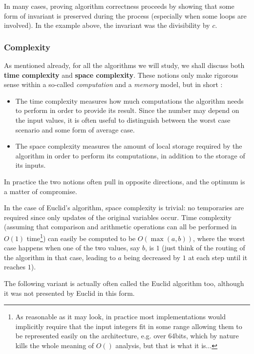 \documentclass[12pt]{article}
\theoremstyle{plain}
\theoremstyle{remark}
\begin{document}
In many cases, proving algorithm correctness proceeds by showing that some form
of invariant is preserved during the process (especially when some loops are
involved). In the example above, the invariant was the divisibility by $c$.

\subsubsection*{Complexity}

As mentioned already, for all the algorithms we will study, we shall discuss both {\bf
time complexity} and {\bf space complexity}. These notions only make rigorous 
sense within a so-called {\it computation} and a {\it memory} model, but in short :
\begin{itemize}
\item The time complexity measures how much computations the algorithm
needs to perform in order to provide its result. Since the number may
depend on the input values, it is often useful to distinguish between
the worst case scenario and some form of average case.
\item The space complexity measures the amount of local storage required by
the algorithm in order to perform its computations, in addition to the storage
of its inputs.
\end{itemize}

In practice the two notions often pull in opposite directions, and the optimum 
is a matter of compromise.

\medskip

In the case of Euclid's algorithm, space complexity is trivial: no temporaries
are required since only updates of the original variables occur. Time complexity
(assuming that comparison and arithmetic operations can all be performed in
$O(1)$ time\footnote{As reasonable as it may look, in practice most
implementations would implicitly require that the input integers fit in some range
allowing them to be represented easily on the architecture, e.g. over 64bits, 
which by nature kills the whole meaning of $O()$ analysis, but that is what it
is...}) can easily be computed to be $O(\max(a, b))$, where the worst case
happens when one of the two values, say $b$, is $1$ (just think of the routing of the algorithm
in that case, leading to $a$ being decreased by $1$ at each step until it
reaches $1$). 

\medskip

The following variant is actually often called the Euclid algorithm too, 
although it was not presented by Euclid in this form.
\end{document}
